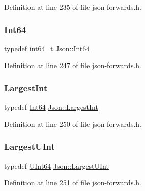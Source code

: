 Definition at line 235 of file json-\/forwards.\+h.

\hypertarget{namespace_json_ac62566f36fd33115957b91305c9ed1dc}{}\label{namespace_json_ac62566f36fd33115957b91305c9ed1dc} 
\subsubsection{\texorpdfstring{Int64}{Int64}}
{\footnotesize\ttfamily typedef int64\+\_\+t \hyperlink{namespace_json_ac62566f36fd33115957b91305c9ed1dc}{Json\+::\+Int64}}



Definition at line 247 of file json-\/forwards.\+h.

\hypertarget{namespace_json_a218d880af853ce786cd985e82571d297}{}\label{namespace_json_a218d880af853ce786cd985e82571d297} 
\subsubsection{\texorpdfstring{Largest\+Int}{LargestInt}}
{\footnotesize\ttfamily typedef \hyperlink{namespace_json_ac62566f36fd33115957b91305c9ed1dc}{Int64} \hyperlink{namespace_json_a218d880af853ce786cd985e82571d297}{Json\+::\+Largest\+Int}}



Definition at line 250 of file json-\/forwards.\+h.

\hypertarget{namespace_json_ae202ecad69725e23443f465e257456d0}{}\label{namespace_json_ae202ecad69725e23443f465e257456d0} 
\subsubsection{\texorpdfstring{Largest\+U\+Int}{LargestUInt}}
{\footnotesize\ttfamily typedef \hyperlink{namespace_json_adf3fa5cb60c619e4f02315ad355e0ca1}{U\+Int64} \hyperlink{namespace_json_ae202ecad69725e23443f465e257456d0}{Json\+::\+Largest\+U\+Int}}



Definition at line 251 of file json-\/forwards.\+h.

\hypertarget{namespace_json_a7132404aeebfc96d7c6ad2c66260afb5}{}\label{namespace_json_a7132404aeebfc96d7c6ad2c66260afb5} 

